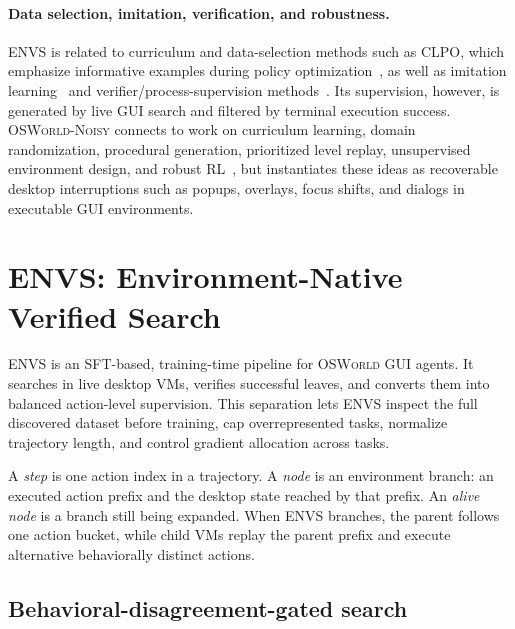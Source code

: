 \documentclass[11pt]{article}
\begin{document}
\paragraph{Data selection, imitation, verification, and robustness.}
\textsc{ENVS} is related to curriculum and data-selection methods such as CLPO, which emphasize informative examples during policy optimization~\citep{zhang2025clpo}, as well as imitation learning~\citep{pomerleau1989alvinn,ross2011dagger} and verifier/process-supervision methods~\citep{cobbe2021verifiers,lightman2023process,gulcehre2023rest}. Its supervision, however, is generated by live GUI search and filtered by terminal execution success. \textsc{OSWorld-Noisy} connects to work on curriculum learning, domain randomization, procedural generation, prioritized level replay, unsupervised environment design, and robust RL~\citep{bengio2009curriculum,tobin2017domain_randomization,cobbe2020procgen,jiang2021plr,dennis2020paired,parkerholder2022accel,pinto2017robust_adversary,zhang2020robust_rl,slaoui2020robust_domain_randomization}, but instantiates these ideas as recoverable desktop interruptions such as popups, overlays, focus shifts, and dialogs in executable GUI environments.

\section{ENVS: Environment-Native Verified Search}

ENVS is an SFT-based, training-time pipeline for \textsc{OSWorld} GUI agents. It searches in live desktop VMs, verifies successful leaves, and converts them into balanced action-level supervision. This separation lets ENVS inspect the full discovered dataset before training, cap overrepresented tasks, normalize trajectory length, and control gradient allocation across tasks.

A \emph{step} is one action index in a trajectory. A \emph{node} is an environment branch: an executed action prefix and the desktop state reached by that prefix. An \emph{alive node} is a branch still being expanded. When ENVS branches, the parent follows one action bucket, while child VMs replay the parent prefix and execute alternative behaviorally distinct actions.

\subsection{Behavioral-disagreement-gated search}
\end{document}
